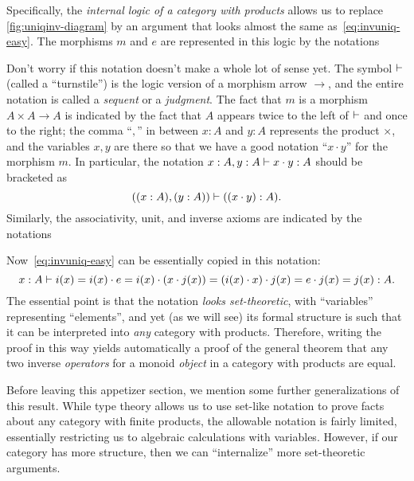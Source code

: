Specifically, the \emph{internal logic of a category with products} allows us to replace \cref{fig:uniqinv-diagram} by an argument that looks almost the same as~\eqref{eq:invuniq-easy}.
The morphisms $m$ and $e$ are represented in this logic by the notations
Don't worry if this notation doesn't make a whole lot of sense yet.
The symbol $\vdash$ (called a ``turnstile'') is the logic version of a morphism arrow $\to$, and the entire notation is called a \emph{sequent} or a \emph{judgment}.
The fact that $m$ is a morphism $A\times A \to A$ is indicated by the fact that $A$ appears twice to the left of $\vdash$ and once to the right; the comma ``$,$'' in between $x:A$ and $y:A$ represents the product $\times$, and the variables $x,y$ are there so that we have a good notation ``$x\cdot y$'' for the morphism $m$.
In particular, the notation $x:A,y:A \vdash x\cdot y :A$ should be bracketed as
\[ ((x:A),(y:A)) \vdash ((x\cdot y) :A). \]
Similarly, the associativity, unit, and inverse axioms are indicated by the notations
Now~\eqref{eq:invuniq-easy} can be essentially copied in this notation:
\[ x:A \vdash i(x) = i(x) \cdot e = i(x) \cdot (x \cdot j(x)) = (i(x)\cdot x)\cdot j(x) = e\cdot j(x) = j(x) : A.\]
The essential point is that the notation \emph{looks set-theoretic}, with ``variables'' representing ``elements'', and yet (as we will see) its formal structure is such that it can be interpreted into \emph{any} category with products.
Therefore, writing the proof in this way yields automatically a proof of the general theorem that any two inverse \emph{operators} for a monoid \emph{object} in a category with products are equal.

Before leaving this appetizer section, we mention some further generalizations of this result.
While type theory allows us to use set-like notation to prove facts about any category with finite products, the allowable notation is fairly limited, essentially restricting us to algebraic calculations with variables.
However, if our category has more structure, then we can ``internalize'' more set-theoretic arguments.

